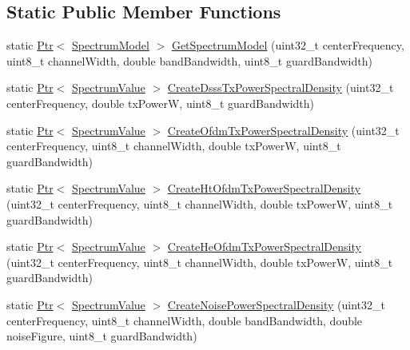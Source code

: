 \subsection*{Static Public Member Functions}
\begin{DoxyCompactItemize}
\item 
static \hyperlink{classns3_1_1Ptr}{Ptr}$<$ \hyperlink{classns3_1_1SpectrumModel}{Spectrum\+Model} $>$ \hyperlink{classns3_1_1WifiSpectrumValueHelper_a09b58fb2741ff1a78ae6d952ad08b1bb}{Get\+Spectrum\+Model} (uint32\+\_\+t center\+Frequency, uint8\+\_\+t channel\+Width, double band\+Bandwidth, uint8\+\_\+t guard\+Bandwidth)
\item 
static \hyperlink{classns3_1_1Ptr}{Ptr}$<$ \hyperlink{classns3_1_1SpectrumValue}{Spectrum\+Value} $>$ \hyperlink{classns3_1_1WifiSpectrumValueHelper_ac55866cbe19f3c45c3f985da5fe351f0}{Create\+Dsss\+Tx\+Power\+Spectral\+Density} (uint32\+\_\+t center\+Frequency, double tx\+PowerW, uint8\+\_\+t guard\+Bandwidth)
\item 
static \hyperlink{classns3_1_1Ptr}{Ptr}$<$ \hyperlink{classns3_1_1SpectrumValue}{Spectrum\+Value} $>$ \hyperlink{classns3_1_1WifiSpectrumValueHelper_a32a14869505db7683618793e0dfd98a8}{Create\+Ofdm\+Tx\+Power\+Spectral\+Density} (uint32\+\_\+t center\+Frequency, uint8\+\_\+t channel\+Width, double tx\+PowerW, uint8\+\_\+t guard\+Bandwidth)
\item 
static \hyperlink{classns3_1_1Ptr}{Ptr}$<$ \hyperlink{classns3_1_1SpectrumValue}{Spectrum\+Value} $>$ \hyperlink{classns3_1_1WifiSpectrumValueHelper_aa665281a873f271a23891864ea1e1051}{Create\+Ht\+Ofdm\+Tx\+Power\+Spectral\+Density} (uint32\+\_\+t center\+Frequency, uint8\+\_\+t channel\+Width, double tx\+PowerW, uint8\+\_\+t guard\+Bandwidth)
\item 
static \hyperlink{classns3_1_1Ptr}{Ptr}$<$ \hyperlink{classns3_1_1SpectrumValue}{Spectrum\+Value} $>$ \hyperlink{classns3_1_1WifiSpectrumValueHelper_a35c32f78f5e62a70691a2d0472f8d6d9}{Create\+He\+Ofdm\+Tx\+Power\+Spectral\+Density} (uint32\+\_\+t center\+Frequency, uint8\+\_\+t channel\+Width, double tx\+PowerW, uint8\+\_\+t guard\+Bandwidth)
\item 
static \hyperlink{classns3_1_1Ptr}{Ptr}$<$ \hyperlink{classns3_1_1SpectrumValue}{Spectrum\+Value} $>$ \hyperlink{classns3_1_1WifiSpectrumValueHelper_ada5070aac3bdad3c9847bbc3e8e37fa5}{Create\+Noise\+Power\+Spectral\+Density} (uint32\+\_\+t center\+Frequency, uint8\+\_\+t channel\+Width, double band\+Bandwidth, double noise\+Figure, uint8\+\_\+t guard\+Bandwidth)
\item 

\end{DoxyCompactItemize}
